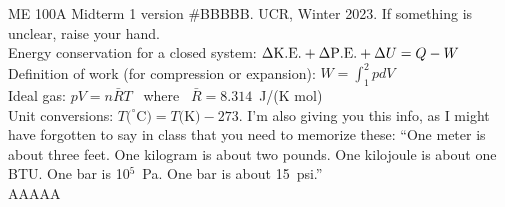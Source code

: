 \documentclass[12pt]{article}
\begin{document}
\setlength{\parindent}{0cm}

ME 100A Midterm 1 version \#BBBBB. UCR, Winter 2023. If something is unclear, raise your hand.\\

Energy conservation for a closed system: $\Delta {\rm K.E.} + \Delta {\rm P.E.} + \Delta U = Q - W$ \\
Definition of work (for compression or expansion): $W=\int_{1}^{2} p dV$ \\
Ideal gas: $p V = n \bar{R} T$ \ where \  $\bar{R}=8.314$~J/(K mol) \\
Unit conversions: $T(^{\circ} $C$) = T($K$) - 273$.  I'm also giving you this info, as I might have forgotten to say in class that you need to memorize these: ``One meter is about three feet.  One kilogram is about two pounds.  One kilojoule is about one BTU.  One bar is 10$^5$~Pa.  One bar is about 15~psi.''\\

AAAAA
\end{document}
